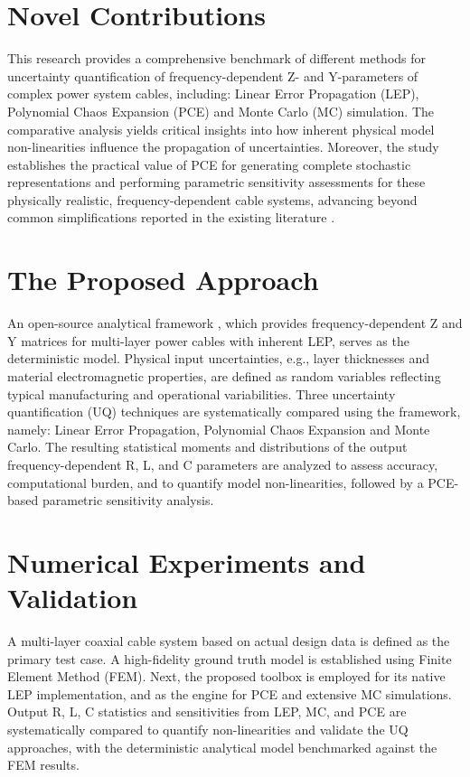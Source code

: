 \documentclass{IEEEtran4PSCC}
\begin{document}
\section{Novel Contributions}
This research provides a comprehensive benchmark of different methods for uncertainty quantification of frequency-dependent Z- and Y-parameters of complex power system cables, including: Linear Error Propagation (LEP), Polynomial Chaos Expansion (PCE) and Monte Carlo (MC) simulation. The comparative analysis yields critical insights into how inherent physical model non-linearities influence the propagation of uncertainties. Moreover, the study establishes the practical value of PCE for generating complete stochastic representations and performing parametric sensitivity assessments for these physically realistic, frequency-dependent cable systems, advancing beyond common simplifications reported in the existing literature \cite{Manfredi2020, Triverio2015}.

\section{The Proposed Approach}
An open-source analytical framework \cite{amauri_g_martins_britto_linecablemodelsjl_nodate}, which provides frequency-dependent Z and Y matrices for multi-layer power cables with inherent LEP, serves as the deterministic model. Physical input uncertainties, e.g., layer thicknesses and material electromagnetic properties, are defined as random variables reflecting typical manufacturing and operational variabilities. Three uncertainty quantification (UQ) techniques are systematically compared using the framework, namely: Linear Error Propagation, Polynomial Chaos Expansion and Monte Carlo. The resulting statistical moments and distributions of the output frequency-dependent R, L, and C parameters are analyzed to assess accuracy, computational burden, and to quantify model non-linearities, followed by a PCE-based parametric sensitivity analysis.

\section{Numerical Experiments and Validation}
A multi-layer coaxial cable system based on actual design data is defined as the primary test case. A high-fidelity ground truth model is established using Finite Element Method (FEM). Next, the proposed toolbox is employed for its native LEP implementation, and as the engine for PCE and extensive MC simulations. Output R, L, C statistics and sensitivities from LEP, MC, and PCE are systematically compared to quantify non-linearities and validate the UQ approaches, with the deterministic analytical model benchmarked against the FEM results.



\end{document}
